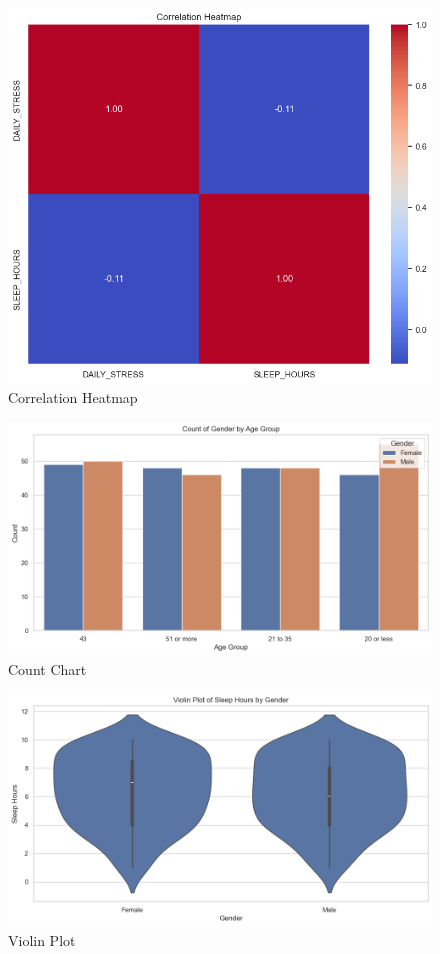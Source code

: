 \documentclass[runningheads]{llncs}
\begin{document}
\begin{enumerate}
\begin{figure}
    \centering
    \includegraphics[width=1.0\linewidth]{eda6.png}
    \caption{Correlation Heatmap} 
    \label{fig:enter-label}
\end{figure}

\begin{figure}
    \centering
    \includegraphics[width=1.0\linewidth]{eda7.png}
    \caption{Count Chart} 
    \label{fig:enter-label} 
\end{figure}

\begin{figure}
    \centering
    \includegraphics[width=1.0\linewidth]{eda8.png}
    \caption{Violin Plot} 
    \label{fig:enter-label}
\end{figure}


\end{enumerate}
\end{document}
